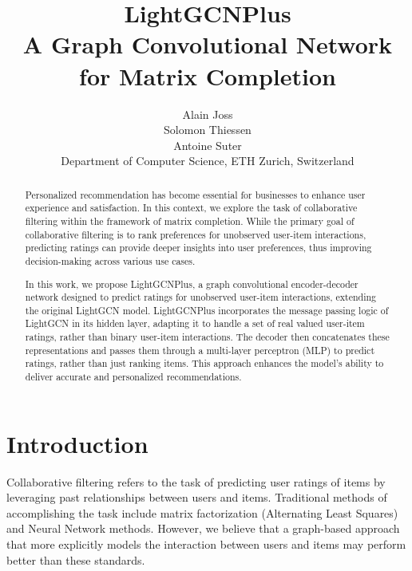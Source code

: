 \documentclass[10pt,conference,compsocconf]{IEEEtran}
\begin{document}
\title{LightGCNPlus \\ A Graph Convolutional Network for Matrix Completion}

\author{
  Alain Joss \\
  Solomon Thiessen \\
  Antoine Suter \\
  Department of Computer Science, ETH Zurich, Switzerland
}

\maketitle

\begin{abstract}
  Personalized recommendation has become essential for businesses to enhance user experience and satisfaction. 
  In this context, we explore the task of collaborative filtering within the framework of matrix completion. 
  While the primary goal of collaborative filtering is to rank preferences for unobserved user-item interactions, 
  predicting ratings can provide deeper insights into user preferences, 
  thus improving decision-making across various use cases.
  
  In this work, we propose LightGCNPlus, a graph convolutional encoder-decoder network designed to predict ratings for unobserved user-item interactions, 
  extending the original LightGCN model. 
  LightGCNPlus incorporates the message passing logic of LightGCN in its hidden layer, adapting it to handle a set of real valued user-item ratings, rather than binary user-item interactions.
  The decoder then concatenates these representations and passes them through a multi-layer perceptron (MLP) to predict ratings, rather than just ranking items. 
  This approach enhances the model's ability to deliver accurate and personalized recommendations.
\end{abstract}


\section{Introduction}

Collaborative filtering refers to the task of predicting user ratings of items by leveraging past relationships between users and items. Traditional methods of accomplishing the task include matrix factorization (Alternating Least Squares) and Neural Network methods. However, we believe that a graph-based approach that more explicitly models the interaction between users and items may perform better than these standards.
\end{document}
